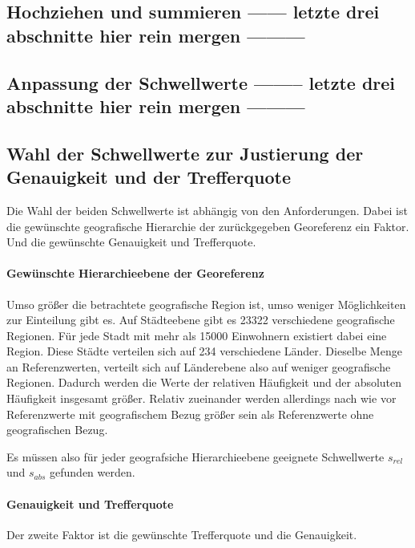 		\subsection{Hochziehen und summieren ------ letzte drei abschnitte hier rein mergen ---------}

		\subsection{Anpassung der Schwellwerte -------- letzte drei abschnitte hier rein mergen ---------}

		\subsection{Wahl der Schwellwerte zur Justierung der Genauigkeit und der Trefferquote}

			Die Wahl der beiden Schwellwerte ist abhängig von den Anforderungen.
			Dabei ist die gewünschte geografische Hierarchie der zurückgegeben Georeferenz ein Faktor.
			Und die gewünschte Genauigkeit und Trefferquote.
			
			\paragraph{Gewünschte Hierarchieebene der Georeferenz}

				Umso größer die betrachtete geografische Region ist, umso weniger Möglichkeiten zur Einteilung gibt es.
				Auf Städteebene gibt es 23322 verschiedene geografische Regionen. 
				Für jede Stadt mit mehr als 15000 Einwohnern existiert dabei eine Region.
				Diese Städte verteilen sich auf 234 verschiedene Länder.
				Dieselbe Menge an Referenzwerten, verteilt sich auf Länderebene also auf weniger geografische Regionen. 
				Dadurch werden die Werte der relativen Häufigkeit und der absoluten Häufigkeit insgesamt größer.
				Relativ zueinander werden allerdings nach wie vor Referenzwerte mit geografischem Bezug größer sein als Referenzwerte ohne geografischen Bezug.

				Es müssen also für jeder geografsiche Hierarchieebene geeignete Schwellwerte $s_{rel}$ und $s_{abs}$ gefunden werden.

			\paragraph{Genauigkeit und Trefferquote} 

				Der zweite Faktor ist die gewünschte Trefferquote und die Genauigkeit.

